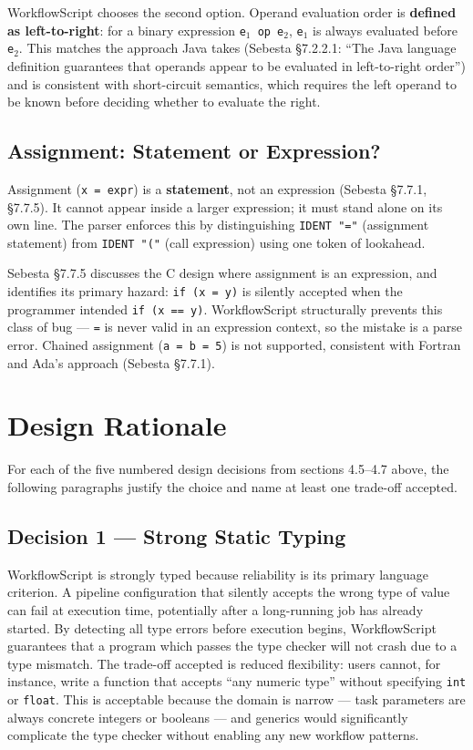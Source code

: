 \documentclass[10pt,a4paper]{article}
\begin{document}
WorkflowScript chooses the second option. Operand evaluation order is \textbf{defined as
left-to-right}: for a binary expression \texttt{e$_1$ op e$_2$}, \texttt{e$_1$} is always
evaluated before \texttt{e$_2$}. This matches the approach Java takes (Sebesta \S7.2.2.1:
``The Java language definition guarantees that operands appear to be evaluated in
left-to-right order'') and is consistent with short-circuit semantics, which requires the
left operand to be known before deciding whether to evaluate the right.

\subsection{Assignment: Statement or Expression?}

Assignment (\texttt{x = expr}) is a \textbf{statement}, not an expression
(Sebesta \S7.7.1, \S7.7.5). It cannot appear inside a larger expression; it must stand
alone on its own line. The parser enforces this by distinguishing \texttt{IDENT "="} (assignment
statement) from \texttt{IDENT "("} (call expression) using one token of lookahead.

Sebesta \S7.7.5 discusses the C design where assignment is an expression, and identifies its
primary hazard: \texttt{if (x = y)} is silently accepted when the programmer intended
\texttt{if (x == y)}. WorkflowScript structurally prevents this class of bug --- \texttt{=}
is never valid in an expression context, so the mistake is a parse error. Chained assignment
(\texttt{a = b = 5}) is not supported, consistent with Fortran and Ada's approach
(Sebesta \S7.7.1).

\section{Design Rationale}

For each of the five numbered design decisions from sections 4.5--4.7 above, the following
paragraphs justify the choice and name at least one trade-off accepted.

\subsection{Decision 1 --- Strong Static Typing}

WorkflowScript is strongly typed because reliability is its primary language criterion. A
pipeline configuration that silently accepts the wrong type of value can fail at execution
time, potentially after a long-running job has already started. By detecting all type errors
before execution begins, WorkflowScript guarantees that a program which passes the type checker
will not crash due to a type mismatch. The trade-off accepted is reduced flexibility: users
cannot, for instance, write a function that accepts ``any numeric type'' without specifying
\texttt{int} or \texttt{float}. This is acceptable because the domain is narrow --- task
parameters are always concrete integers or booleans --- and generics would significantly
complicate the type checker without enabling any new workflow patterns.
\end{document}

